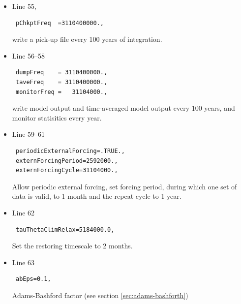 {\begin{itemize}

\item Line 55,
\begin{verbatim}
 pChkptFreq  =3110400000.,
\end{verbatim}
write a pick-up file every 100 years of integration.

\item Line 56--58
\begin{verbatim}
 dumpFreq    = 3110400000.,
 taveFreq    = 3110400000.,
 monitorFreq =   31104000.,
\end{verbatim}
  write model output and time-averaged model output every 100 years,
  and monitor statisitics every year.

\item Line 59--61
\begin{verbatim}
 periodicExternalForcing=.TRUE.,
 externForcingPeriod=2592000.,
 externForcingCycle=31104000.,
\end{verbatim}
  Allow periodic external forcing, set forcing period, during which
  one set of data is valid, to 1 month and the repeat cycle to 1 year.\\
\item Line 62
\begin{verbatim}
 tauThetaClimRelax=5184000.0,
\end{verbatim}
  Set the restoring timescale to 2 months.\\

\item Line 63
\begin{verbatim}
 abEps=0.1,
\end{verbatim}
  Adams-Bashford factor (see section \ref{sec:adams-bashforth})


\end{itemize}}
